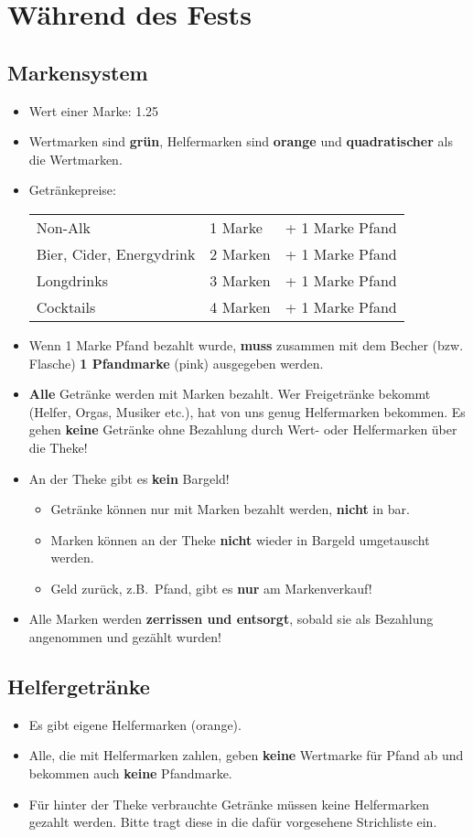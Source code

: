 \section{Während des Fests}
\subsection{Markensystem}
\begin{itemize}
  \item Wert einer Marke: {\large\SI{1.25}{\EUR}}
  \item Wertmarken sind \textbf{grün}, Helfermarken sind \textbf{orange} und \textbf{quadratischer} als die Wertmarken.
  \item Getränkepreise:

    \begin{tabular}{lll}
      Non-Alk & 1 Marke & + 1 Marke Pfand \\
      Bier, Cider, Energydrink & 2 Marken & + 1 Marke Pfand \\
      Longdrinks & 3 Marken & + 1 Marke Pfand \\
      Cocktails & 4 Marken & + 1 Marke Pfand
    \end{tabular}
  \item Wenn 1 Marke Pfand bezahlt wurde, \textbf{muss} zusammen mit dem Becher (bzw. Flasche) \textbf{1 Pfandmarke} (pink) ausgegeben werden.
  \item \textbf{Alle} Getränke werden mit Marken bezahlt. Wer Freigetränke bekommt (Helfer, Orgas, Musiker etc.), hat von uns genug Helfermarken bekommen. Es gehen \textbf{keine} Getränke ohne Bezahlung durch Wert- oder Helfermarken über die Theke!
  \item An der Theke gibt es \textbf{kein} Bargeld!
    \begin{itemize}
      \item Getränke können nur mit Marken bezahlt werden, \textbf{nicht} in bar.
      \item Marken können an der Theke \textbf{nicht} wieder in Bargeld umgetauscht werden.
      \item Geld zurück, z.B.\ Pfand, gibt es \textbf{nur} am Markenverkauf!
    \end{itemize}
  \item Alle Marken werden \textbf{zerrissen und entsorgt}, sobald sie als Bezahlung angenommen und gezählt wurden!
\end{itemize}
\subsection{Helfergetränke}
\begin{itemize}
  \item Es gibt eigene Helfermarken (orange).
  \item Alle, die mit Helfermarken zahlen, geben \textbf{keine} Wertmarke für Pfand ab und bekommen auch \textbf{keine} Pfandmarke.
  \item Für hinter der Theke verbrauchte Getränke müssen keine Helfermarken gezahlt werden. Bitte tragt diese in die dafür vorgesehene Strichliste ein.
\end{itemize}
